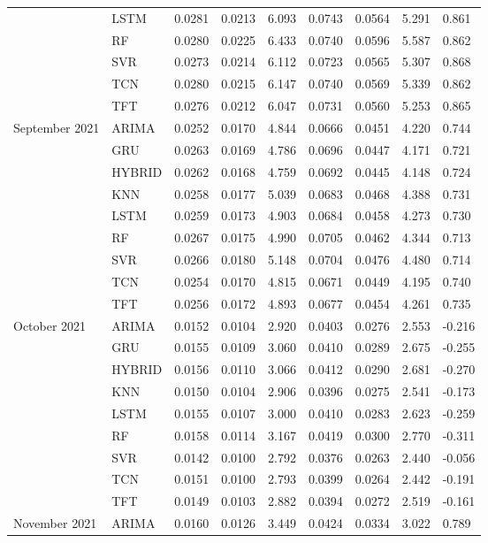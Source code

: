 \begin{tabular}{lllllllll}
 & LSTM & 0.0281 & 0.0213 & 6.093 & 0.0743 & 0.0564 & 5.291 & 0.861 \\
 & RF & 0.0280 & 0.0225 & 6.433 & 0.0740 & 0.0596 & 5.587 & 0.862 \\
 & SVR & 0.0273 & 0.0214 & 6.112 & 0.0723 & 0.0565 & 5.307 & 0.868 \\
 & TCN & 0.0280 & 0.0215 & 6.147 & 0.0740 & 0.0569 & 5.339 & 0.862 \\
 & TFT & 0.0276 & 0.0212 & 6.047 & 0.0731 & 0.0560 & 5.253 & 0.865 \\
September 2021 & ARIMA & 0.0252 & 0.0170 & 4.844 & 0.0666 & 0.0451 & 4.220 & 0.744 \\
 & GRU & 0.0263 & 0.0169 & 4.786 & 0.0696 & 0.0447 & 4.171 & 0.721 \\
 & HYBRID & 0.0262 & 0.0168 & 4.759 & 0.0692 & 0.0445 & 4.148 & 0.724 \\
 & KNN & 0.0258 & 0.0177 & 5.039 & 0.0683 & 0.0468 & 4.388 & 0.731 \\
 & LSTM & 0.0259 & 0.0173 & 4.903 & 0.0684 & 0.0458 & 4.273 & 0.730 \\
 & RF & 0.0267 & 0.0175 & 4.990 & 0.0705 & 0.0462 & 4.344 & 0.713 \\
 & SVR & 0.0266 & 0.0180 & 5.148 & 0.0704 & 0.0476 & 4.480 & 0.714 \\
 & TCN & 0.0254 & 0.0170 & 4.815 & 0.0671 & 0.0449 & 4.195 & 0.740 \\
 & TFT & 0.0256 & 0.0172 & 4.893 & 0.0677 & 0.0454 & 4.261 & 0.735 \\
October 2021 & ARIMA & 0.0152 & 0.0104 & 2.920 & 0.0403 & 0.0276 & 2.553 & -0.216 \\
 & GRU & 0.0155 & 0.0109 & 3.060 & 0.0410 & 0.0289 & 2.675 & -0.255 \\
 & HYBRID & 0.0156 & 0.0110 & 3.066 & 0.0412 & 0.0290 & 2.681 & -0.270 \\
 & KNN & 0.0150 & 0.0104 & 2.906 & 0.0396 & 0.0275 & 2.541 & -0.173 \\
 & LSTM & 0.0155 & 0.0107 & 3.000 & 0.0410 & 0.0283 & 2.623 & -0.259 \\
 & RF & 0.0158 & 0.0114 & 3.167 & 0.0419 & 0.0300 & 2.770 & -0.311 \\
 & SVR & 0.0142 & 0.0100 & 2.792 & 0.0376 & 0.0263 & 2.440 & -0.056 \\
 & TCN & 0.0151 & 0.0100 & 2.793 & 0.0399 & 0.0264 & 2.442 & -0.191 \\
 & TFT & 0.0149 & 0.0103 & 2.882 & 0.0394 & 0.0272 & 2.519 & -0.161 \\
November 2021 & ARIMA & 0.0160 & 0.0126 & 3.449 & 0.0424 & 0.0334 & 3.022 & 0.789 \\

\end{tabular}
